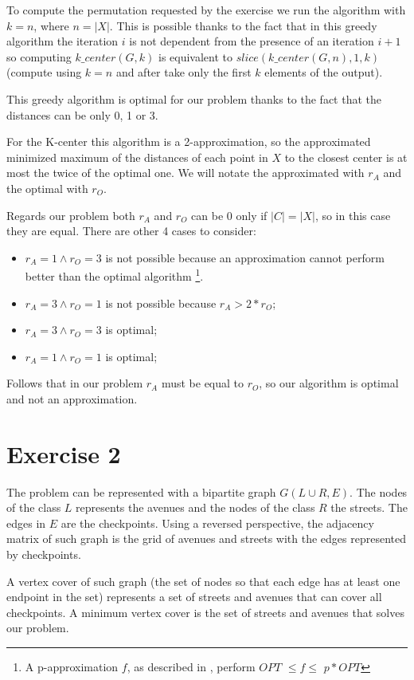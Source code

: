 \documentclass[paper=a4, fontsize=11pt]{scrartcl} %
\numberwithin{equation}{section} %
\numberwithin{figure}{section} %
\numberwithin{table}{section} %
\begin{document}
To compute the permutation requested by the exercise we run the algorithm with $k = n$, where $n = |X|$.
This is possible thanks to the fact that in this greedy algorithm the iteration $i$ is not dependent from the presence of an iteration $i+1$ so computing $k\_center(G, k)$ is equivalent to $slice(k\_center(G, n), 1, k)$ (compute using $k=n$ and after take only the first $k$ elements of the output).

This greedy algorithm is optimal for our problem thanks to the fact that the distances can be only 0, 1 or 3.

For the K-center this algorithm is a 2-approximation, so the approximated minimized maximum of the distances of each point in $X$ to the closest center is at most the twice of the optimal one.
We will notate the approximated with $r_A$ and the optimal with $r_O$.

Regards our problem both $r_A$ and $r_O$ can be 0 only if $|C| = |X|$, so in this case they are equal.
There are other 4 cases to consider:

\begin{itemize}
    \item $r_A = 1 \land r_O = 3$ is not possible because an approximation cannot perform better than the optimal algorithm \footnote{A p-approximation $f$, as described in \cite{app}, perform $OPT$ $\leq f \leq$ $p*OPT$}.
    \item $r_A = 3 \land r_O = 1$ is not possible because $r_A > 2*r_O$;
    \item $r_A = 3 \land r_O = 3$ is optimal;
    \item $r_A = 1 \land r_O = 1$ is optimal;
\end{itemize}

Follows that in our problem $r_A$ must be equal to $r_O$, so our algorithm is optimal and not an approximation.



\newpage
\section*{Exercise 2}

The problem can be represented with a bipartite graph $G(L \cup R, E)$.
The nodes of the class $L$ represents the avenues and the nodes of the class $R$ the streets.
The edges in $E$ are the checkpoints.
Using a reversed perspective, the adjacency matrix of such graph is the grid of avenues and streets with the edges represented by checkpoints.

A vertex cover of such graph (the set of nodes so that each edge has at least one endpoint in the set) represents a set of streets and avenues that can cover all checkpoints.
A minimum vertex cover is the set of streets and avenues that solves our problem.
\end{document}
